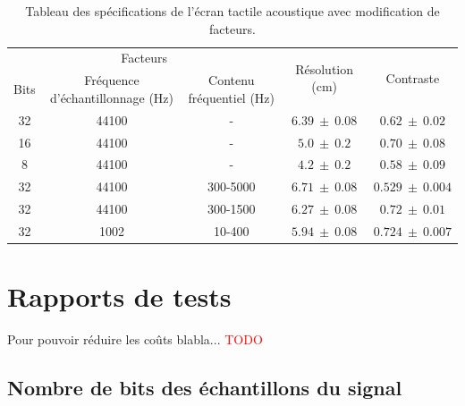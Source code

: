 ﻿\documentclass[11pt,letterpaper]{article}
\begin{document}
\begin{table}[H]
    \centering
    \begin{tabular}{c c c | c c}
    \hline
    \multicolumn{3}{c|}{Facteurs} & \multirow{2}{*}{Résolution (cm)} & \multirow{2}{*}{Contraste} \\ 
    Bits & Fréquence d'échantillonnage (Hz) & Contenu fréquentiel (Hz) & & \\
    \hline
    32 & 44100 & - & $6.39\ \pm \ 0.08$ & $0.62 \ \pm\ 0.02$ \\
    16 & 44100 & - & $5.0\ \pm \ 0.2$ & $0.70 \ \pm\ 0.08$ \\
    8 & 44100 & - & $4.2 \ \pm\ 0.2$ & $0.58  \ \pm\ 0.09$ \\
    32 & 44100 & 300-5000 & $6.71\ \pm\ 0.08$ & $0.529\ \pm\ 0.004$ \\
    32 & 44100 & 300-1500 &	$6.27\ \pm\ 0.08$ &	$0.72\ \pm\ 0.01$ \\
    32 & 1002 & 10-400 & $5.94\ \pm\ 0.08$ & $0.724\ \pm\ 0.007$  \\
    \hline
    \end{tabular}
    \caption{Tableau des spécifications de l'écran tactile acoustique avec modification de facteurs.\label{specs}}
  \end{table}


\section{Rapports de tests}






Pour pouvoir réduire les coûts blabla... \textcolor{red}{TODO}

\subsection{Nombre de bits des échantillons du signal}
\end{document}
